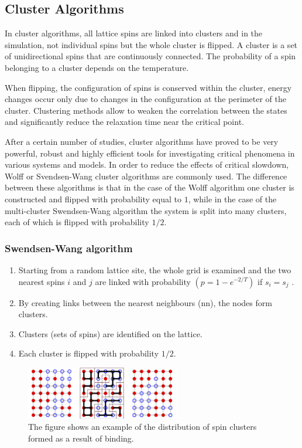 \subsection{Cluster Algorithms}

In cluster algorithms, all lattice spins are linked into clusters and in the simulation, not individual spins but the whole cluster is flipped. A cluster is a set of unidirectional spins that are continuously connected. The probability of a spin belonging to a cluster depends on the temperature.

When flipping, the configuration of spins is conserved within the cluster, energy changes occur only due to changes in the configuration at the perimeter of the cluster. Clustering methods allow to weaken the correlation between the states and significantly reduce the relaxation time near the critical point.

After a certain number of studies, cluster algorithms have proved to be very powerful, robust and highly efficient tools for investigating critical phenomena in various systems and models. In order to reduce the effects of critical slowdown, Wolff or Svendsen-Wang cluster algorithms are commonly used. The difference between these algorithms is that in the case of the Wolff algorithm one cluster is constructed and flipped with probability equal to $1$, while in the case of the multi-cluster Swendsen-Wang algorithm the system is split into many clusters, each of which is flipped with probability $1/2$.

\subsubsection{Swendsen-Wang algorithm \cite{SW}}

\begin{enumerate}
	\item Starting from a random lattice site, the whole grid is examined and the two nearest spins $i$ and $j$ are linked with probability $(p=1-e^{-2/T})$ if $s_i = s_j$ .
	\item By creating links between the nearest neighbours (nn), the nodes form clusters.
	\item Clusters (sets of spins) are identified on the lattice.
	\item Each cluster is flipped with probability $1/2$.
\end{enumerate}

\begin{figure}[h!]
  \label{fig:SwendsenWang}
  \includegraphics[width=0.6\textwidth]{figures/SW_2.png}
  \centering
  \caption{The figure shows an example of the distribution of spin clusters formed as a result of binding. }
\end{figure}

